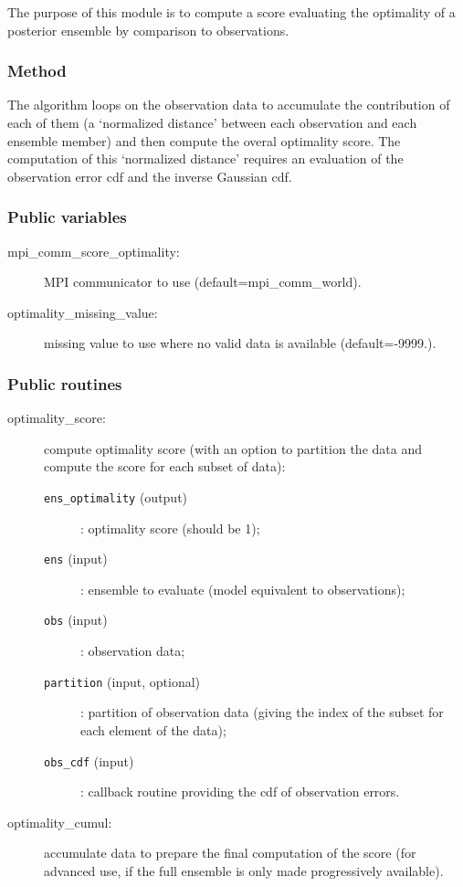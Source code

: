 \documentclass[11pt]{article}
\begin{document}
The purpose of this module is to compute a score
evaluating the optimality of a posterior ensemble
by comparison to observations.

\subsubsection*{Method}

The algorithm loops on the observation data
to accumulate the contribution of each of them
(a `normalized distance' between each observation and each ensemble member)
and then compute the overal optimality score.
The computation of this `normalized distance' requires an evaluation
of the observation error cdf and the inverse Gaussian cdf.

\subsubsection*{Public variables}

\begin{description}
\item[mpi\_comm\_score\_optimality:] MPI communicator to use (default=mpi\_comm\_world).
\item[optimality\_missing\_value:] missing value to use where no valid data is available (default=-9999.).
\end{description}

\subsubsection*{Public routines}

\begin{description}
\item[optimality\_score:] compute optimality score (with an option to partition the data
                    and compute the score for each subset of data):
  \begin{description}
  \item[{\tt ens\_optimality} (output)]: optimality score (should be 1);
  \item[{\tt ens} (input)]: ensemble to evaluate (model equivalent to observations);
  \item[{\tt obs} (input)]: observation data;
  \item[{\tt partition} (input, optional)]: partition of observation data
                                  (giving the index of the subset for each element of the data);
  \item[{\tt obs\_cdf} (input)]: callback routine providing the cdf of observation errors.
  \end{description}
\item[optimality\_cumul:] accumulate data to prepare the final computation of the score
                    (for advanced use, if the full ensemble is only made progressively available).
\end{description}
\end{document}
